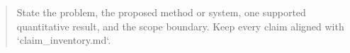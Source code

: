 \begin{abstract}
State the problem, the proposed method or system, one supported quantitative result, and the scope boundary. Keep every claim aligned with `claim_inventory.md`.
\end{abstract}
